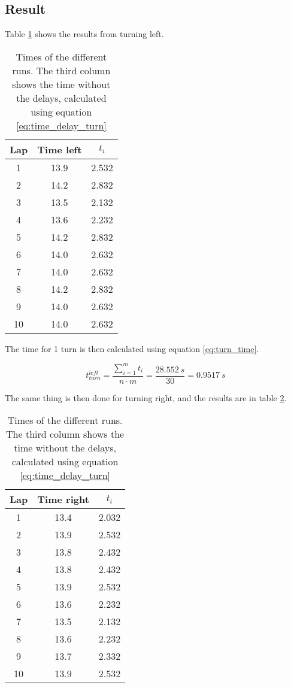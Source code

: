 \documentclass[a4paper,10pt]{article}
\begin{document}
\subsection{Result}
Table \ref{tab:time_left} shows the results from turning left.
\begin{table} [H]
\centering
 \begin{tabular}{|c|c|c|}
  \hline Lap & Time left & $t_i$ \\ \hline
  1  & 13.9  & 2.532 \\  \hline
  2  & 14.2  & 2.832 \\  \hline
  3  & 13.5  & 2.132 \\  \hline
  4  & 13.6  & 2.232 \\  \hline
  5  & 14.2  & 2.832 \\  \hline
  6  & 14.0  & 2.632 \\  \hline
  7  & 14.0  & 2.632 \\  \hline
  8  & 14.2  & 2.832 \\  \hline
  9  & 14.0  & 2.632 \\  \hline
  10 & 14.0  & 2.632 \\ \hline
 \end{tabular}
 \caption{Times of the different runs. The third column shows the time without the delays, calculated using equation \ref{eq:time_delay_turn}}
 \label{tab:time_left}
\end{table}



The time for 1 turn is then calculated using equation \ref{eq:turn_time}.

$$
t_{turn}^{left} = \frac{\sum^{m}_{i=1}t_i}{n\cdot m} = \frac{28.552\ s}{30} = 0.9517\ s
$$

The same thing is then done for turning right, and the results are in table \ref{tab:time_right}.

\begin{table} [H]
\centering
 \begin{tabular}{|c|c|c|}
  \hline Lap & Time right & $t_i$ \\ \hline
  1  & 13.4  & 2.032 \\  \hline
  2  & 13.9  & 2.532 \\  \hline
  3  & 13.8  & 2.432 \\  \hline
  4  & 13.8  & 2.432 \\  \hline
  5  & 13.9  & 2.532 \\  \hline
  6  & 13.6  & 2.232 \\  \hline
  7  & 13.5  & 2.132 \\  \hline
  8  & 13.6  & 2.232 \\  \hline
  9  & 13.7  & 2.332 \\  \hline
  10 & 13.9  & 2.532 \\ \hline
 \end{tabular}
 \caption{Times of the different runs. The third column shows the time without the delays, calculated using equation \ref{eq:time_delay_turn}}
 \label{tab:time_right}
\end{table}
\end{document}
